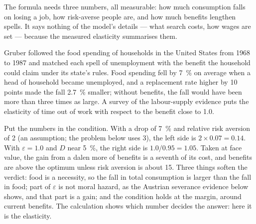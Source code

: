 The formula needs three numbers, all measurable: how much consumption falls on
losing a job, how risk-averse people are, and how much benefits lengthen spells.
It says nothing of the model's details --- what search costs, how wages are set ---
because the measured elasticity summarises them.

\begin{record}
Gruber followed the food spending of households in the United States from 1968 to
1987 and matched each spell of unemployment with the benefit the household could
claim under its state's rules. Food spending fell by 7~\% on average when a head of
household became unemployed, and a replacement rate higher by 10 points made the
fall 2.7~\% smaller; without benefits, the fall would have been more than three
times as large. %
A survey of the labour-supply evidence puts the elasticity of time out of work with
respect to the benefit close to 1.0. %
\end{record}

Put the numbers in the condition. With a drop of 7~\% and relative risk aversion of 2
(an assumption; the problem below uses 3), the left side is $2 \times 0.07 = 0.14$. With $\varepsilon = 1.0$ and $D$ near 5~\%, the
right side is $1.0/0.95 = 1.05$. Taken at face value, the gain from a dalen more of
benefits is a seventh of its cost, and benefits are above the optimum unless risk
aversion is about 15. Three things soften the verdict: food is a necessity, so the
fall in total consumption is larger than the fall in food; part of $\varepsilon$ is not moral
hazard, as the Austrian severance evidence below shows, and that part is a gain;
and the condition holds at the margin, around current benefits. The calculation
shows which number decides the answer: here it is the elasticity.

\begin{omfigure}
\par{}
\end{omfigure}

